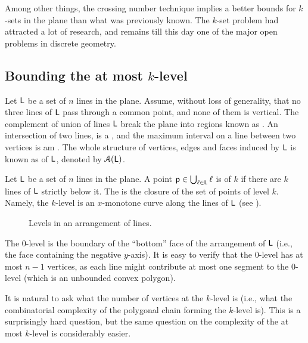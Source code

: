 Among other things, the crossing number technique implies a better
bounds for $k$-sets in the plane than what was previously known. The
$k$-set problem had attracted a lot of research, and remains till this
day one of the major open problems in discrete geometry.

\subsection{Bounding the at most $k$-level}

Let $\mathsf{L}$ be a set of $n$ lines in the plane. Assume, without
loss of generality, that no three lines of $\mathsf{L}$ pass through a
common point, and none of them is vertical. The complement of union of
lines $\mathsf{L}$ break the plane into regions known as
. An intersection of two lines, is a , and
the maximum interval on a line between two vertices is am
. The whole structure of vertices, edges and faces induced
by $\mathsf{L}$ is known as  of $\mathsf{L}$, denoted
by $\ArrX{\LineSet}$.


Let $\mathsf{L}$ be a set of $n$ lines in the plane. A point $\mathsf{p} \in
\bigcup_{\ell \in \mathsf{L}} \ell$ is of  $k$ if there
are $k$ lines of $\mathsf{L}$ strictly below it. The
 is the closure of the set of
points of level $k$. Namely, the $k$-level is an $x$-monotone curve
along the lines of $\mathsf{L}$ (see ).

\begin{figure}[t]
    \centering
    \caption{Levels in an arrangement of lines.}
\end{figure}

The $0$-level is the boundary of the ``bottom'' face of the
arrangement of $\mathsf{L}$ (i.e., the face containing the negative
$y$-axis). It is easy to verify that the $0$-level has at most $n-1$
vertices, as each line might contribute at most one segment to the
$0$-level (which is an unbounded convex polygon).

It is natural to ask what the number of vertices at the $k$-level is
(i.e., what the combinatorial complexity of the polygonal chain
forming the $k$-level is). This is a surprisingly hard question, but
the same question on the complexity of the at most $k$-level is
considerably easier.


